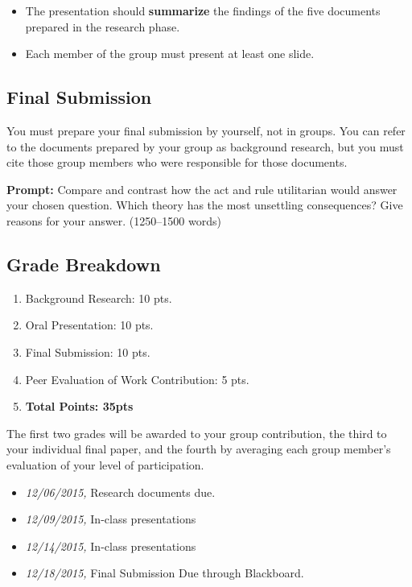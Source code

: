 \documentclass[]{article}
\providecommand{\tightlist}{%
  \setlength{\itemsep}{0pt}\setlength{\parskip}{0pt}}
\begin{document}
\begin{itemize}
\tightlist
\item
  The presentation should \textbf{summarize} the findings of the five
  documents prepared in the research phase.
\item
  Each member of the group must present at least one slide.
\end{itemize}

\subsection{Final Submission}\label{final-submission}

You must prepare your final submission by yourself, not in groups. You
can refer to the documents prepared by your group as background
research, but you must cite those group members who were responsible for
those documents.

\textbf{Prompt:} Compare and contrast how the act and rule utilitarian
would answer your chosen question. Which theory has the most unsettling
consequences? Give reasons for your answer. (1250--1500 words)

\subsection{Grade Breakdown}\label{grade-breakdown}

\begin{enumerate}
\def\labelenumi{\arabic{enumi}.}
\tightlist
\item
  Background Research: 10 pts.
\item
  Oral Presentation: 10 pts.
\item
  Final Submission: 10 pts.
\item
  Peer Evaluation of Work Contribution: 5 pts.
\item
  \textbf{Total Points: 35pts}
\end{enumerate}

The first two grades will be awarded to your group contribution, the
third to your individual final paper, and the fourth by averaging each
group member's evaluation of your level of participation.

\begin{itemize}

 \item \textit{12/06/2015,} Research documents due. 

\item \textit{12/09/2015,} In-class presentations

\item \textit{12/14/2015,} In-class presentations

\item \textit{12/18/2015,} Final Submission Due through Blackboard. 

\end{itemize}
\end{document}
